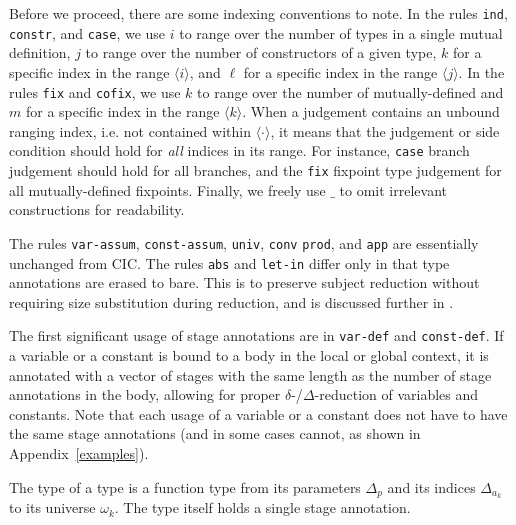 \documentclass[sigplan,10pt,anonymous,review,nonacm]{acmart}
\begin{document}
Before we proceed, there are some indexing conventions to note. In the rules \texttt{ind}, \texttt{constr}, and \texttt{case}, we use $i$ to range over the number of \coinductive types in a single mutual \coinductive definition, $j$ to range over the number of constructors of a given \coinductive type, $k$ for a specific index in the range $\langle i \rangle$, and $\ell$ for a specific index in the range $\langle j \rangle$. In the rules \texttt{fix} and \texttt{cofix}, we use $k$ to range over the number of mutually-defined \cofixpoints and $m$ for a specific index in the range $\langle k \rangle$. When a judgement contains an unbound ranging index, i.e. not contained within $\langle \cdot \rangle$, it means that the judgement or side condition should hold for \textit{all} indices in its range. For instance, \texttt{case} branch judgement should hold for all branches, and the \texttt{fix} fixpoint type judgement for all mutually-defined fixpoints. Finally, we freely use $\_$ to omit irrelevant constructions for readability.

The rules \texttt{var-assum}, \texttt{const-assum}, \texttt{univ}, \texttt{conv} \texttt{prod}, and \texttt{app} are essentially unchanged from CIC. The rules \texttt{abs} and \texttt{let-in} differ only in that type annotations are erased to bare. This is to preserve subject reduction without requiring size substitution during reduction, and is discussed further in \cite{cic-hat-bar}.

The first significant usage of stage annotations are in \texttt{var-def} and \texttt{const-def}. If a variable or a constant is bound to a body in the local or global context, it is annotated with a vector of stages with the same length as the number of stage annotations in the body, allowing for proper $\delta$-/$\Delta$-reduction of variables and constants. Note that each usage of a variable or a constant does not have to have the same stage annotations (and in some cases cannot, as shown in Appendix~\ref{examples}).

The type of a \coinductive type is a function type from its parameters $\Delta_p$ and its indices $\Delta_{a_k}$ to its universe $\omega_k$. The \coinductive type itself holds a single stage annotation.
\end{document}
